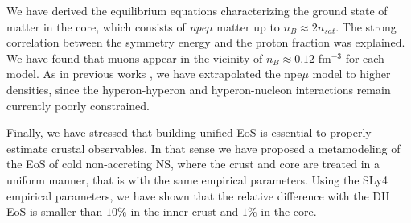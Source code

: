 We have derived the equilibrium equations characterizing the ground state of
matter in the core, which consists of \textit{npe$\mu$} matter up to $n_B
\approx 2n_{sat}$. The strong correlation between the symmetry energy and the 
proton fraction was explained. We have found that muons appear in the vicinity 
of $n_B \approx 0.12$ fm$^{-3}$ for each model. As in previous works
\cite{Wiringa1988,Douchin2001}, we have extrapolated the npe$\mu$ model to 
higher densities, since the hyperon-hyperon and hyperon-nucleon interactions 
remain currently poorly constrained.

Finally, we have stressed that building unified EoS is essential to properly
estimate crustal observables. In that sense we have proposed a metamodeling of 
the EoS of cold non-accreting NS, where the crust and core are treated in a
uniform manner, that is with the same empirical parameters. Using the SLy4
empirical parameters, we have shown that the relative difference with the DH 
EoS is smaller than $10\%$ in the inner crust and $1\%$ in the core. 
